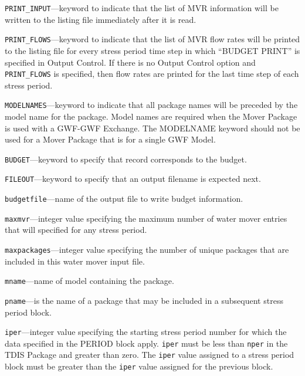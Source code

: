 
\item \texttt{PRINT\_INPUT}---keyword to indicate that the list of MVR information will be written to the listing file immediately after it is read.

\item \texttt{PRINT\_FLOWS}---keyword to indicate that the list of MVR flow rates will be printed to the listing file for every stress period time step in which ``BUDGET PRINT'' is specified in Output Control.  If there is no Output Control option and \texttt{PRINT\_FLOWS} is specified, then flow rates are printed for the last time step of each stress period.

\item \texttt{MODELNAMES}---keyword to indicate that all package names will be preceded by the model name for the package.  Model names are required when the Mover Package is used with a GWF-GWF Exchange.  The MODELNAME keyword should not be used for a Mover Package that is for a single GWF Model.

\item \texttt{BUDGET}---keyword to specify that record corresponds to the budget.

\item \texttt{FILEOUT}---keyword to specify that an output filename is expected next.

\item \texttt{budgetfile}---name of the output file to write budget information.

\item \texttt{maxmvr}---integer value specifying the maximum number of water mover entries that will specified for any stress period.

\item \texttt{maxpackages}---integer value specifying the number of unique packages that are included in this water mover input file.

\item \texttt{mname}---name of model containing the package.

\item \texttt{pname}---is the name of a package that may be included in a subsequent stress period block.

\item \texttt{iper}---integer value specifying the starting stress period number for which the data specified in the PERIOD block apply.  \texttt{iper} must be less than \texttt{nper} in the TDIS Package and greater than zero.  The \texttt{iper} value assigned to a stress period block must be greater than the \texttt{iper} value assigned for the previous block.

